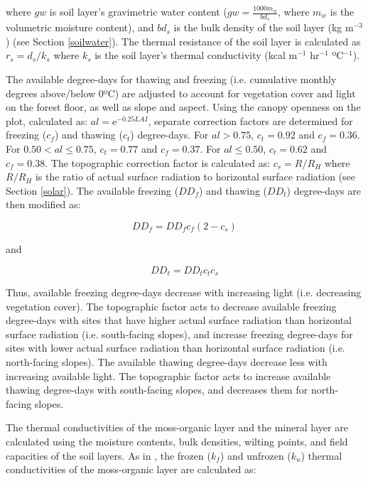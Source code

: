 \documentclass[a4paper, 12pt] {report}
\begin{document}
where $gw$ is soil layer's gravimetric water content ($gw = \frac{1000m_w}{bd_s}$, where $m_w$ is the volumetric moisture content), and $bd_s$ is the bulk density of the soil layer (kg m$^{-3}$) (see Section \ref{soilwater}). The thermal resistance of the soil layer is calculated as $r_s = d_s/k_s$ where $k_s$ is the soil layer's thermal conductivity (kcal m$^{-1}$ hr$^{-1}$ ºC$^{-1}$).

The available degree-days for thawing and freezing (i.e. cumulative monthly degrees above/below 0ºC) are adjusted to account for vegetation cover and light on the forest floor, as well as slope and aspect. Using the canopy openness on the plot, calculated as: $al = \text{e}^{-0.25LAI}$, separate correction factors are determined for freezing ($c_f$) and thawing ($c_t$) degree-days. For $al > 0.75$, $c_t = 0.92$ and $c_f = 0.36$. For $0.50 < al \leq 0.75$, $c_t = 0.77$ and $c_f = 0.37$. For $al \leq 0.50$, $c_t = 0.62$ and $c_f = 0.38$. The topographic correction factor is calculated as: $c_s = R/R_H$ where $R/R_H$ is the ratio of actual surface radiation to horizontal surface radiation (see Section \ref{solar}). The available freezing ($DD_f$) and thawing ($DD_t$) degree-days are then modified as:

\begin{equation}
DD_f = DD_fc_f(2 - c_s)
\end{equation}

and

\begin{equation}
DD_t = DD_tc_tc_s
\end{equation}

Thus, available freezing degree-days decrease with increasing light (i.e. decreasing vegetation cover). The topographic factor acts to decrease available freezing degree-days with sites that have higher actual surface radiation than horizontal surface radiation (i.e. south-facing slopes), and increase freezing degree-days for sites with lower actual surface radiation than horizontal surface radiation (i.e. north-facing slopes). The available thawing degree-days decrease less with increasing available light. The topographic factor acts to increase available thawing degree-days with south-facing slopes, and decreases them for north-facing slopes.

The thermal conductivities of the moss-organic layer and the mineral layer are calculated using the moisture contents, bulk densities, wilting points, and field capacities of the soil layers. As in , the frozen ($k_f$) and unfrozen ($k_u$) thermal conductivities of the moss-organic layer are calculated as:
\end{document}
